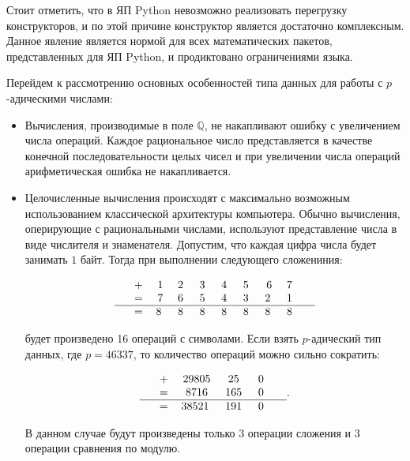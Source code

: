 \documentclass[master, och, diploma, times]{sty/SCWorks}
\theoremstyle{plain}
\theoremstyle{definition}
\numberwithin{equation}{section}
\begin{document}
Стоит отметить, что в ЯП Python невозможно реализовать перегрузку конструкторов, и по этой причине конструктор является достаточно комплексным. Данное явление является нормой для всех математических пакетов, представленных для ЯП Python, и продиктовано ограничениями языка.  


Перейдем к рассмотрению основных особенностей типа данных для работы с $p$-адическими числами:

\begin{itemize}

\item Вычисления, производимые в поле $\mathbb{Q}$, не накапливают ошибку с увеличением числа операций. Каждое рациональное число представляется в качестве конечной последовательности целых чисел и при увеличении числа операций арифметическая ошибка не накапливается.

\item Целочисленные вычисления происходят с максимально возможным использованием классической архитектуры компьютера. Обычно вычисления, оперирующие с рациональными числами, используют представление числа в виде числителя и знаменателя. Допустим, что каждая цифра числа будет занимать $1$ байт. Тогда при выполнении следующего сложениния:

$$
\begin{tabular}{ccccccccccc}
& + & 1 & 2\; & 3\; & 4\; & 5\; & 6 & 7\; &  \\
& = & 7 & 6\; & 5\; & 4\; & 3\; & 2\; & 1\; &  \\
\hline
& = & 8\; & 8\; & 8\; & 8\; & 8\; & 8\; & 8\; &
\end{tabular}
$$

будет произведено 16 операций с символами. Если взять $p$-адический тип данных, где $p=46337$, то количество операций можно сильно сократить:

$$
\begin{tabular}{ccccccccccc}
& + & 29805 & 25\; & 0\; &  \\
& = & 8716 & 165\; & 0\; & \\
\hline
& = & 38521\; & 191\; & 0\; &
\end{tabular}.
$$

В данном случае будут произведены только $3$ операции сложения и $3$ операции сравнения по модулю.


\end{itemize}
\end{document}
